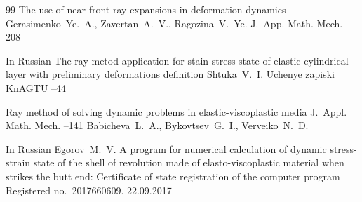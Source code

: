 \begin{thebibliography}{99}
\paper The use of near-front ray expansions in deformation dynamics
\by Gerasimenko~Ye.~A., Zavertan~A.~V., Ragozina~V.~Ye.
\jour J.~App. Math. Mech.
--208

\lang In Russian
\paper The ray metod application for stain-stress state of elastic cylindrical layer with preliminary deformations definition
\by    Shtuka~V.~I.
\jour Uchenye zapiski KnAGTU
--44







\paper Ray method of solving dynamic problems in elastic-viscoplastic media
\jour J.~Appl. Math. Mech.
--141
\by Babicheva~L.~A., Bykovtsev~G.~I., Verveiko~N.~D.

\lang In Russian
\by    Egorov~M.~V.
\preprint A program for numerical calculation of dynamic stress-strain state of the shell of revolution made  of elasto-viscoplastic material  when strikes the butt end\rm: Certificate of state registration of the computer program
\preprintinfo Registered no.~2017660609. 22.09.2017

\end{thebibliography}

\renewcommand{\baselinestretch}{0.9}

%
